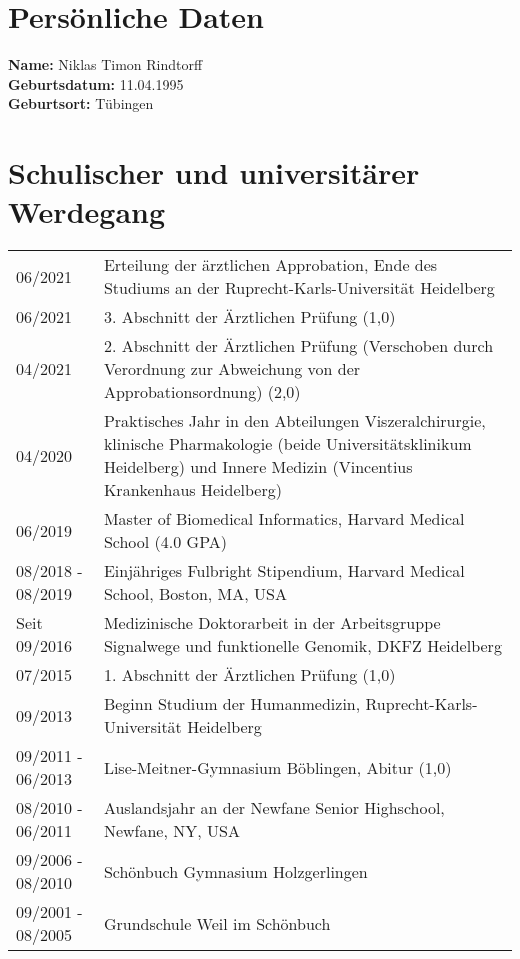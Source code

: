 \usepackage{tabularx}
\usepackage{geometry}

\pagestyle{empty}
\begin{flushleft}

\section*{Persönliche Daten}

\textbf{Name:} Niklas Timon Rindtorff \\
\textbf{Geburtsdatum:} 11.04.1995 \\
\textbf{Geburtsort:} Tübingen \\


\section*{Schulischer und universitärer Werdegang}

\noindent
\begin{tabularx}{\textwidth}{@{}lX@{}}
06/2021 & Erteilung der ärztlichen Approbation, Ende des Studiums an der Ruprecht-Karls-Universität Heidelberg \\
06/2021 & 3. Abschnitt der Ärztlichen Prüfung (1,0) \\
04/2021 & 2. Abschnitt der Ärztlichen Prüfung (Verschoben durch Verordnung zur Abweichung von der Approbationsordnung) (2,0) \\
04/2020 & Praktisches Jahr in den Abteilungen Viszeralchirurgie, klinische Pharmakologie (beide Universitätsklinikum Heidelberg) und Innere Medizin (Vincentius Krankenhaus Heidelberg) \\
06/2019 & Master of Biomedical Informatics, Harvard Medical School (4.0 GPA) \\
08/2018 - 08/2019 & Einjähriges Fulbright Stipendium, Harvard Medical School, Boston, MA, USA \\
Seit 09/2016 & Medizinische Doktorarbeit in der Arbeitsgruppe Signalwege und funktionelle Genomik, DKFZ Heidelberg \\
07/2015 & 1. Abschnitt der Ärztlichen Prüfung (1,0)  \\
09/2013 & Beginn Studium der Humanmedizin, Ruprecht-Karls-Universität Heidelberg \\
09/2011 - 06/2013 & Lise-Meitner-Gymnasium Böblingen, Abitur (1,0) \\
08/2010 - 06/2011 & Auslandsjahr an der Newfane Senior Highschool, Newfane, NY, USA \\
09/2006 - 08/2010 & Schönbuch Gymnasium Holzgerlingen \\
09/2001 - 08/2005 & Grundschule Weil im Schönbuch \\
\end{tabularx}

\end{flushleft}

